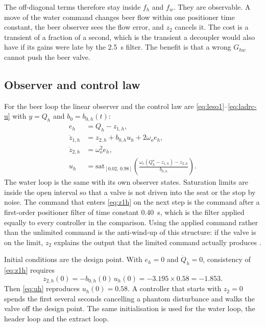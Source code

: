 The off-diagonal terms therefore stay inside $f_h$ and $f_w$. They are observable. A move of the water command changes beer flow within one positioner time constant, the beer observer sees the flow error, and $z_2$ cancels it. The cost is a transient of a fraction of a second, which is the transient a decoupler would also have if its gains were late by the \SI{2.5}{s} filter. The benefit is that a wrong $G_{hw}$ cannot push the beer valve.

\subsection{Observer and control law}

For the beer loop the linear observer and the control law are \eqref{eq:leso1}--\eqref{eq:ladrc-u} with $y = Q_h$ and $b_0 = b_{0,h}(t)$:
\begin{align}
e_h &= Q_h - z_{1,h}, \label{eq:eh}\\
\dot{z}_{1,h} &= z_{2,h} + b_{0,h} u_h + 2\omega_o e_h, \label{eq:z1h}\\
\dot{z}_{2,h} &= \omega_o^2 e_h, \label{eq:z2h}\\
u_h &= \mathrm{sat}_{[0.02,\,0.98]}\left(\frac{\omega_c(Q_h^\star - z_{1,h}) - z_{2,h}}{b_{0,h}}\right). \label{eq:uh}
\end{align}
The water loop is the same with its own observer states. Saturation limits are inside the open interval so that a valve is not driven into the seat or the stop by noise. The command that enters \eqref{eq:z1h} on the next step is the command after a first-order positioner filter of time constant \SI{0.40}{s}, which is the filter applied equally to every controller in the comparison. Using the applied command rather than the unlimited command is the anti-wind-up of this structure: if the valve is on the limit, $z_2$ explains the output that the limited command actually produces \cite{han2009pid,astrom2006advanced}.

Initial conditions are the design point. With $e_h=0$ and $\dot{Q}_h=0$, consistency of \eqref{eq:z1h} requires
\begin{equation}
\label{eq:z2init}
z_{2,h}(0) = -b_{0,h}(0)\, u_h(0) = -3.195\times 0.58 = -1.853.
\end{equation}
Then \eqref{eq:uh} reproduces $u_h(0)=0.58$. A controller that starts with $z_2=0$ spends the first several seconds cancelling a phantom disturbance and walks the valve off the design point. The same initialisation is used for the water loop, the header loop and the extract loop.

